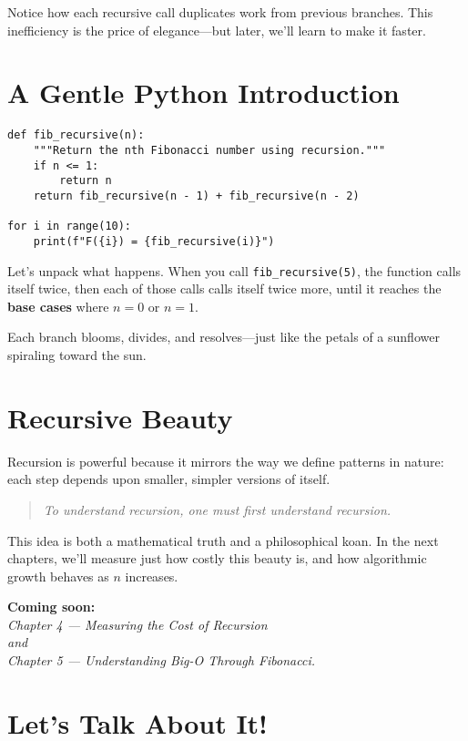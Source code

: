 Notice how each recursive call duplicates work from previous branches.  
This inefficiency is the price of elegance—but later, we’ll learn to make it faster.

\section{A Gentle Python Introduction}

\begin{verbatim}
def fib_recursive(n):
    """Return the nth Fibonacci number using recursion."""
    if n <= 1:
        return n
    return fib_recursive(n - 1) + fib_recursive(n - 2)

for i in range(10):
    print(f"F({i}) = {fib_recursive(i)}")
\end{verbatim}

Let’s unpack what happens.  
When you call \texttt{fib\_recursive(5)}, the function calls itself twice,  
then each of those calls calls itself twice more,  
until it reaches the \textbf{base cases} where $n = 0$ or $n = 1$.

Each branch blooms, divides, and resolves—just like the petals of a sunflower spiraling toward the sun.

\section{Recursive Beauty}
Recursion is powerful because it mirrors the way we define patterns in nature:  
each step depends upon smaller, simpler versions of itself.

\begin{quote}
\textit{To understand recursion, one must first understand recursion.}
\end{quote}

This idea is both a mathematical truth and a philosophical koan.  
In the next chapters, we’ll measure just how costly this beauty is,  
and how algorithmic growth behaves as $n$ increases.

\begin{center}
\textbf{Coming soon:}\\
\textit{Chapter 4 — Measuring the Cost of Recursion}\\
\textit{and}\\
\textit{Chapter 5 — Understanding Big-O Through Fibonacci.}
\end{center}

\newpage

\section*{Let’s Talk About It!}

